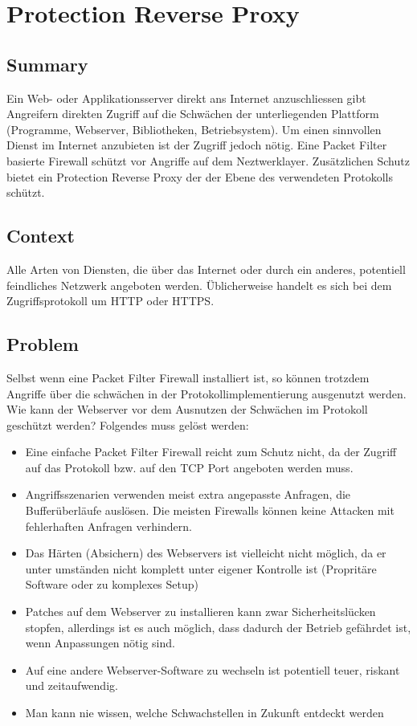\chapter{Protection Reverse Proxy}

\section{Summary}
Ein Web- oder Applikationsserver direkt ans Internet anzuschliessen gibt Angreifern direkten Zugriff auf die Schwächen der unterliegenden Plattform (Programme, Webserver, Bibliotheken, Betriebsystem). Um einen sinnvollen Dienst im Internet anzubieten ist der Zugriff jedoch nötig. Eine Packet Filter basierte Firewall schützt vor Angriffe auf dem Neztwerklayer. Zusätzlichen Schutz bietet ein Protection Reverse Proxy der der Ebene des verwendeten Protokolls schützt.

\section{Context}
Alle Arten von Diensten, die über das Internet oder durch ein anderes, potentiell feindliches Netzwerk angeboten werden. Üblicherweise handelt es sich bei dem Zugriffsprotokoll um HTTP oder HTTPS.

\section{Problem}
Selbst wenn eine Packet Filter Firewall installiert ist, so können trotzdem Angriffe über die schwächen in der Protokollimplementierung ausgenutzt werden. Wie kann der Webserver vor dem Ausnutzen der Schwächen im Protokoll geschützt werden? Folgendes muss gelöst werden:
\begin{itemize}
\item Eine einfache Packet Filter Firewall reicht zum Schutz nicht, da der Zugriff auf das Protokoll bzw. auf den TCP Port angeboten werden muss.
\item Angriffsszenarien verwenden meist extra angepasste Anfragen, die Bufferüberläufe auslösen. Die meisten Firewalls können keine Attacken mit fehlerhaften Anfragen verhindern.
\item Das Härten (Absichern) des Webservers ist vielleicht nicht möglich, da er unter umständen nicht komplett unter eigener Kontrolle ist (Propritäre Software oder zu komplexes Setup)
\item Patches auf dem Webserver zu installieren kann zwar Sicherheitslücken stopfen, allerdings ist es auch möglich, dass dadurch der Betrieb gefährdet ist, wenn Anpassungen nötig sind.
\item Auf eine andere Webserver-Software zu wechseln ist potentiell teuer, riskant und zeitaufwendig.
\item Man kann nie wissen, welche Schwachstellen in Zukunft entdeckt werden
\end{itemize}

